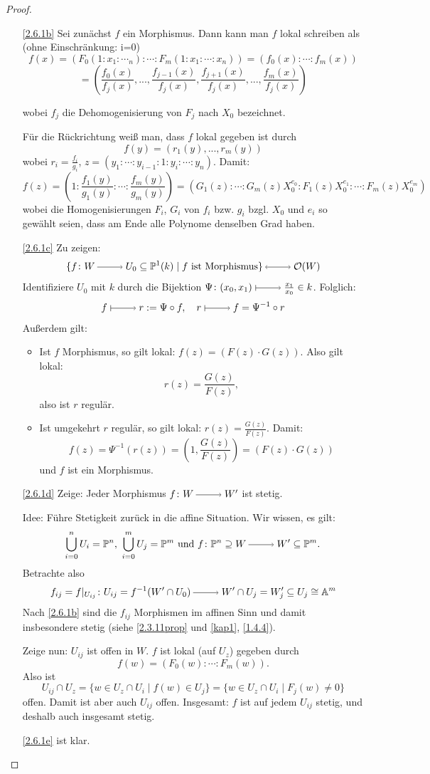 \documentclass[a4paper,12pt]{scrbook}
\theoremstyle{keinenummern} %
\theoremstyle{mitnummern}
\theoremstyle{unserbeweis}
\newtheorem{proof}{Beweis}
\def\A{\mathbb{A}}
\def\O{\mathcal{O}}
\def\P{\mathbb{P}}
\newcommand{\restrict}[1]{|_{#1}}
\renewcommand{\dotsc}{\ensuremath{\!...}}
\newcommand{\ra}{\raisebox{-1pt}{\tikz{\draw[thin,shorten >=3pt, ->] (0,0) node{\hspace*{-2pt}} -- node{} (1,0);}}\penalty1000\relax}
\renewcommand{\mapsto}{\raisebox{-1pt}{\tikz{\draw[thin,shorten >=3pt, |->] (0,0) node{\hspace*{0pt}} -- node{} (1,0);}}\penalty1000\relax}
\newcommand{\lra}{\raisebox{-1pt}{\tikz{\draw[thin,shorten >=3pt, <->] (0,0) node{\hspace*{-2pt}} -- node{} (1,0);}}\penalty1000\relax}
\begin{document}
\begin{proof}
  \begin{enumerate}
  \item[\ref{2.6.1b}] Sei zunächst $f$ ein Morphismus. Dann kann man $f$ lokal schreiben als (ohne Einschränkung: i=0)
\[f(x)=(F_0(1:x_1:\dotsm_n):\dotsm:F_m(1:x_1:\dotsm:x_n))=(f_0(x):\dotsm :f_m(x))\]
\[=(\frac {f_0(x)}{f_j(x)},\dotsc,\frac{f_{j-1}(x)}{f_j(x)},\frac{f_{j+1}(x)}{f_j(x)},\dotsc,\frac {f_m(x)}{f_j(x)})\]

wobei $f_j$ die Dehomogenisierung von $F_j$ nach $X_0$ bezeichnet.

Für die Rückrichtung weiß man, dass $f$ lokal gegeben ist durch 
\[f(y)=(r_1(y),\dotsc,r_m(y))\]
wobei $r_i=\frac{f_i}{g_i}$, $z=(y_1:\dotsm:y_{i-1}:1:y_i:\dotsm :y_n)$. Damit:
\[ f(z)=(1:\frac{f_1(y)}{g_1(y)}:\dotsm :\frac{f_m(y)}{g_m(y)})=(G_1(z):\dotsm :G_m(z)X_0^{e_0}:F_1(z)X_0^{e_1}: \dotsm :F_m(z)X_0^{e_m})\]
wobei die Homogenisierungen $F_i$, $G_i$ von $f_i$ bzw. $g_i$ bzgl. $X_0$ und $e_i$ so gewählt seien, dass am Ende alle Polynome denselben Grad haben.  
  \item[\ref{2.6.1c}] Zu zeigen:
\[\{f\colon W\ra U_0\subseteq \P^1(k) \mid f \text{ ist Morphismus}\} \lra \O(W)\]
Identifiziere $U_0$ mit $k$ durch die Bijektion $\Psi \colon (x_0,x_1)\mapsto \frac{x_1}{x_0} \in k$. Folglich:
\[f\mapsto r:=\Psi \circ f, \quad r\mapsto f=\Psi^{-1}\circ r\]
Außerdem gilt:\begin{itemize}
    \item Ist $f$ Morphismus, so gilt lokal: $f(z)=(F(z)\cdot G(z))$. Also gilt lokal: \[r(z)=\frac{G(z)}{F(z)},\] also ist $r$ regulär.
    \item Ist umgekehrt $r$ regulär, so gilt lokal: $r(z)=\frac{G(z)}{F(z)}$. Damit: 
\[f(z)=\Psi^{-1}(r(z))=(1,\frac{G(z)}{F(z)})=(F(z)\cdot G(z))\]
und $f$ ist ein Morphismus.\end{itemize}

  \item[\ref{2.6.1d}] {\sc Zeige:} Jeder Morphismus $f\colon W\ra W'$ ist stetig.

 {\sc Idee:} Führe Stetigkeit zurück in die affine Situation.
Wir wissen, es gilt:
\[\bigcup_{i=0}^{n}U_i=\P^n,\ \bigcup_{i=0}^{m}U_j=\P^m\text{ und } f\colon \P^n \supseteq W\ra W'\subseteq \P^m.\]
Betrachte also
\[ f_{ij}=f\restrict{U_{ij}} \colon U_{ij}=f^{-1}(W'\cap U_0)\ra W'\cap U_j=W_j'\subseteq U_j\cong \A^m\]
Nach \ref{2.6.1b} sind die $f_{ij}$ Morphismen im affinen Sinn und damit insbesondere stetig (siehe \cref{2.3.11prop} und \cref{kap1}, \cref{1.4.4}).

Zeige nun: $U_{ij}$ ist offen in $W$. $f$ ist lokal (auf $U_z$) gegeben durch 
\[f(w)=(F_0(w):\dotsm :F_m(w)).\]
Also ist 
\[U_{ij}\cap U_z=\{w \in U_z\cap U_i \mid f(w) \in U_j\}=\{w \in U_z\cap U_i \mid F_j(w)\neq 0\}\]
offen. Damit ist aber auch $U_{ij}$ offen.
Insgesamt: $f$ ist auf jedem $U_{ij}$ stetig, und deshalb auch insgesamt stetig.
  \item[\ref{2.6.1e}] ist klar.
  \end{enumerate}  
\end{proof}
\end{document}
